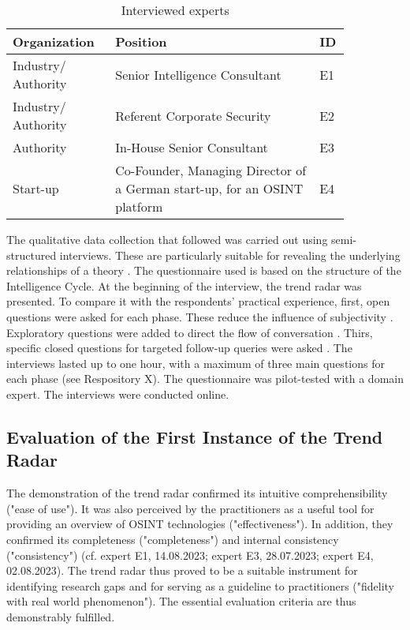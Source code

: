 \documentclass[10pt]{article}
\begin{document}
\begin{table}[htbp]
    \label{tab:experts}
    \caption{Interviewed experts}
    \begin{tabular}{|p{0.25\linewidth}|p{0.55\linewidth}|p{0.05\linewidth}|}
        \hline
        \textbf{Organization} & \textbf{Position}                                                         & \textbf{ID} \\
        \hline
        Industry/ Authority   & Senior Intelligence Consultant                                            & E1          \\
        \hline
        Industry/ Authority   & Referent Corporate Security                                               & E2          \\
        \hline
        Authority             & In-House Senior Consultant                                                & E3          \\
        \hline
        Start-up              & Co-Founder, Managing Director of a German start-up, for an OSINT platform & E4          \\
        \hline
    \end{tabular}
\end{table}

The qualitative data collection that followed was carried out using
semi-structured interviews. These are particularly suitable for
revealing the underlying relationships of a theory \cite{Bogner.2014}. The
questionnaire used is based on the structure of the Intelligence Cycle.
At the beginning of the interview, the trend radar was presented.
To compare it with the respondents' practical experience, first, open questions
were asked for each phase. These reduce the influence of
subjectivity \cite{Saunders.2012}. Exploratory questions were added to direct the flow of conversation
\cite{Saunders.2012}. Thirs, specific closed questions for targeted follow-up
queries were asked \cite{Saunders.2012}. The interviews lasted up to one hour, with a maximum of three
main questions for each phase \cite{Bogner.2014} (see Respository X). The questionnaire
was pilot-tested with a domain expert. The interviews were conducted online.

\subsection{Evaluation of the First Instance of the Trend Radar}

The demonstration of the trend radar confirmed its intuitive
comprehensibility ("ease of use"). It was also perceived by the
practitioners as a useful tool for providing an overview of OSINT
technologies ("effectiveness"). In addition, they confirmed its
completeness ("completeness") and internal consistency ("consistency")
(cf. expert E1, 14.08.2023; expert E3, 28.07.2023; expert E4,
02.08.2023). The trend radar thus proved to be a
suitable instrument for identifying research gaps and for serving as a guideline to practitioners
("fidelity with real world phenomenon"). The essential evaluation
criteria \cite{Sonnenberg.2012} are thus demonstrably fulfilled.
\end{document}
